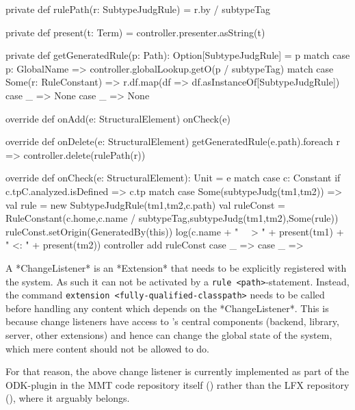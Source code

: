 \begin{example}
\begin{nscalacode}[label=lst:lf:lfx:subtyping:clistener,caption={A Change Listener Generating Subtyping Rules  \protect\footnotemark},emph={SubtypeJudgRule,subtypeJudg,RuleConstant}]
{  private def rulePath(r: SubtypeJudgRule) = r.by / subtypeTag

  private def present(t: Term) = controller.presenter.asString(t)

  private def getGeneratedRule(p: Path): Option[SubtypeJudgRule] = {
    p match {
      case p: GlobalName =>
        controller.globalLookup.getO(p / subtypeTag) match {
          case Some(r: RuleConstant) => r.df.map(df => df.asInstanceOf[SubtypeJudgRule])
          case _ => None
        }
      case _ => None
    }
  }

  override def onAdd(e: StructuralElement) {
    onCheck(e)
  }

  override def onDelete(e: StructuralElement) {
    getGeneratedRule(e.path).foreach { r => controller.delete(rulePath(r)) }
  }

  override def onCheck(e: StructuralElement): Unit = e match {
    case c: Constant if c.tpC.analyzed.isDefined => c.tp match {
      case Some(subtypeJudg(tm1,tm2)) =>
        val rule = new SubtypeJudgRule(tm1,tm2,c.path)
        val ruleConst = RuleConstant(c.home,c.name / subtypeTag,subtypeJudg(tm1,tm2),Some(rule))
        ruleConst.setOrigin(GeneratedBy(this))
        log(c.name + " ~~> " + present(tm1) + " <: " + present(tm2))
        controller add ruleConst
      case _ =>
    }
    case _ =>
  }
}
	\end{nscalacode}
\end{example}

\begin{remark}
	A *ChangeListener* is an *Extension* that needs to be explicitly registered with the \mmt system. As such it can not be activated by a \lstinline[language=mmt,style=mmt]|rule <path>|-statement. Instead, the command \lstinline|extension <fully-qualified-classpath>| needs to be called before handling any content which depends on the *ChangeListener*. This is because change listeners have access to \mmt's central components (backend, library, server, other extensions) and hence can change the global state of the system, which mere content should not be allowed to do. 
	
	For that reason, the above change listener is currently implemented as part of the ODK-plugin in the MMT code repository itself (\cite{mmt:repo:on}) rather than the LFX repository (\cite{mmtlfx:git}), where it arguably belongs.
\end{remark}

